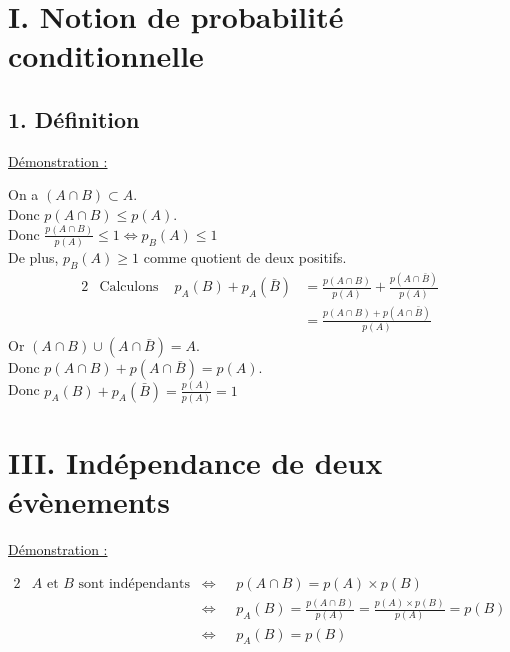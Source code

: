 \documentclass[11pt,a4paper]{article}
\title{\doctitre}
\author{\docniveau \\ \doctheme\text{ - }\doctype}
\date{}
\begin{document}
\maketitle
\pagestyle{custom}
\thispagestyle{custom}

\section*{I. Notion de probabilité conditionnelle}

\subsection*{1. Définition}

\underline{Démonstration :}

On a $(A\cap B)\subset A$.\\
Donc $p(A\cap B) \leq p(A)$. \\
Donc $\frac{p(A\cap B)}{p(A)}\leq 1 \Leftrightarrow p_B(A) \leq 1$ \\
De plus, $p_B(A) \geq 1$ comme quotient de deux positifs.
\begin{alignat*}{2}
   & \text{Calculons } & p_A(B)+p_A(\bar B) & =\frac{p(A\cap B)}{p(A)}+\frac{p(A\cap \bar B)}{p(A)} \\
   &                   &                    & = \frac{p(A\cap B)+p(A\cap \bar B)}{p(A)}
\end{alignat*}
Or $(A\cap B) \cup (A\cap \bar B) = A$. \\
Donc $p(A\cap B)+p(A\cap \bar B)=p(A)$. \\
Donc $p_A(B)+p_A(\bar B)=\frac{p(A)}{p(A)}=1$

\section*{III. Indépendance de deux évènements}

\underline{Démonstration :}

\begin{alignat*}{2}
   & \text{$A$ et $B$ sont indépendants } & \Leftrightarrow & \text{ } p(A\cap B)=p(A)\times p(B)                                       \\
   &                                      & \Leftrightarrow & \text{ } p_A(B)=\frac{p(A\cap B)}{p(A)}=\frac{p(A)\times p(B)}{p(A)}=p(B) \\
   &                                      & \Leftrightarrow & \text{ } p_A(B)=p(B)                                                      \\
\end{alignat*}
\end{document}
